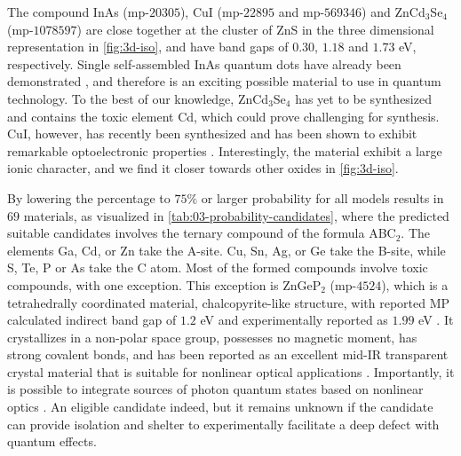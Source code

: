 
The compound InAs (mp-$20305$), CuI (mp-$22895$ and mp-$569346$) and ZnCd$_3$Se$_4$ (mp-$1078597$) are close together at the cluster of ZnS in the three dimensional representation in \autoref{fig:3d-iso}, and have band gaps of $0.30$, $1.18$ and $1.73$ eV, respectively. Single self-assembled InAs quantum dots have already been demonstrated \cite{Liu2018}, and therefore is an exciting possible material to use in quantum technology. To the best of our knowledge, ZnCd$_3$Se$_4$ has yet to be synthesized and contains the toxic element Cd, which could prove challenging for synthesis. CuI, however, has recently been synthesized and has been shown to exhibit remarkable optoelectronic properties \cite{Ahn2020}. Interestingly, the material exhibit a large ionic character, and we find it closer towards other oxides in \autoref{fig:3d-iso}.

By lowering the percentage to $75\%$ or larger probability for all models results in $69$ materials, as visualized in \autoref{tab:03-probability-candidates}, where the predicted suitable candidates involves the ternary compound of the formula ABC$_2$. The elements Ga, Cd, or Zn take the A-site. Cu, Sn, Ag, or Ge take the B-site, while S, Te, P or As take the C atom. Most of the formed compounds involve toxic compounds, with one exception. This exception is ZnGeP$_2$ (mp-$4524$), which is a tetrahedrally coordinated material, chalcopyrite-like structure, with reported MP calculated indirect band gap of $1.2$ eV \cite{Zhang2015} and experimentally reported as $1.99$ eV \cite{Xing1989}.
It crystallizes in a non-polar space group, possesses no magnetic moment, has strong covalent bonds, and has been reported as an excellent mid-IR transparent crystal material that is suitable for nonlinear optical applications \cite{Zhang2015}. Importantly, it is possible to integrate sources of photon quantum states based on nonlinear optics \cite{Caspani2017}. An eligible candidate indeed, but it remains unknown if the candidate can provide isolation and shelter to experimentally facilitate a deep defect with quantum effects.




